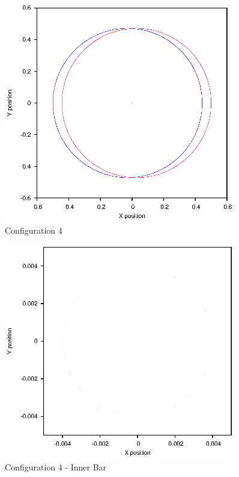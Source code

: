 \documentclass[a4paper,12pt]{article}
\begin{document}
\begin{figure}[H]
\centering
\includegraphics[width=0.9\textwidth]{./2016results/004-5-004/Orbit.eps}
\caption{Configuration 4}
\label{fig:config4}
\end{figure}
\begin{figure}[H]
\centering
\includegraphics[width=0.9\textwidth]{./2016results/004-5-004/Inner.eps}
\caption{Configuration 4 - Inner Bar}
\label{fig:config4i}
\end{figure}
\end{document}
